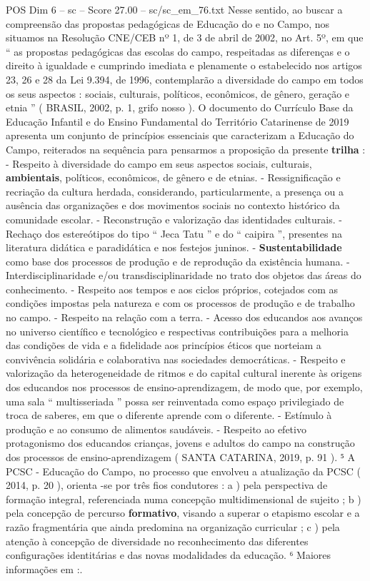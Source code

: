 \begin{textsample}{POS Dim 6 – sc – Score 27.00 – sc/sc\_em\_76.txt}
Nesse sentido, ao buscar a compreensão das propostas pedagógicas de Educação do e no Campo, nos situamos na Resolução CNE/CEB nº 1, de 3 de abril de 2002, no Art. 5º, em que “ as propostas pedagógicas das escolas do campo, respeitadas as diferenças e o direito à igualdade e cumprindo imediata e plenamente o estabelecido nos artigos 23, 26 e 28 da Lei 9.394, de 1996, contemplarão a diversidade do campo em todos os seus aspectos : sociais, culturais, políticos, econômicos, de gênero, geração e etnia ” ( BRASIL, 2002, p. 1, grifo nosso ).
O documento do Currículo Base da Educação Infantil e do Ensino Fundamental do Território Catarinense de 2019 apresenta um conjunto de princípios essenciais que caracterizam a Educação do Campo, reiterados na sequência para pensarmos a proposição da presente \textbf{trilha} : - Respeito à diversidade do campo em seus aspectos sociais, culturais, \textbf{ambientais}, políticos, econômicos, de gênero e de etnias. - Ressignificação e recriação da cultura herdada, considerando, particularmente, a presença ou a ausência das organizações e dos movimentos sociais no contexto histórico da comunidade escolar. - Reconstrução e valorização das identidades culturais. - Rechaço dos estereótipos do tipo “ Jeca Tatu ” e do “ caipira ”, presentes na literatura didática e paradidática e nos festejos juninos. - \textbf{Sustentabilidade} como base dos processos de produção e de reprodução da existência humana. - Interdisciplinaridade e/ou transdisciplinaridade no trato dos objetos das áreas do conhecimento. - Respeito aos tempos e aos ciclos próprios, cotejados com as condições impostas pela natureza e com os processos de produção e de trabalho no campo. - Respeito na relação com a terra. - Acesso dos educandos aos avanços no universo científico e tecnológico e respectivas contribuições para a melhoria das condições de vida e a fidelidade aos princípios éticos que norteiam a convivência solidária e colaborativa nas sociedades democráticas. - Respeito e valorização da heterogeneidade de ritmos e do capital cultural inerente às origens dos educandos nos processos de ensino-aprendizagem, de modo que, por exemplo, uma sala “ multisseriada ” possa ser reinventada como espaço privilegiado de troca de saberes, em que o diferente aprende com o diferente. - Estímulo à produção e ao consumo de alimentos saudáveis. - Respeito ao efetivo protagonismo dos educandos crianças, jovens e adultos do campo na construção dos processos de ensino-aprendizagem ( SANTA CATARINA, 2019, p. 91 ). ⁵ A PCSC - Educação do Campo, no processo que envolveu a atualização da PCSC ( 2014, p. 20 ), orienta -se por três fios condutores : a ) pela perspectiva de formação integral, referenciada numa concepção multidimensional de sujeito ; b ) pela concepção de percurso \textbf{formativo}, visando a superar o etapismo escolar e a razão fragmentária que ainda predomina na organização curricular ; c ) pela atenção à concepção de diversidade no reconhecimento das diferentes configurações identitárias e das novas modalidades da educação. ⁶ Maiores informações em :.

\end{textsample}
